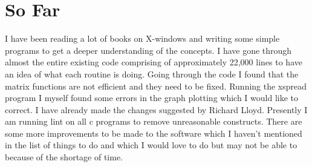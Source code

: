 \section{So Far}
I have been reading a lot of books on X-windows and writing some simple 
programs to get a deeper understanding of the concepts. I have gone through 
almost the entire existing code comprising of approximately 22,000 lines to 
have an idea of what each routine is doing. Going through the code I found 
that the matrix functions are not efficient and they need to be fixed. Running 
the xspread program I myself found some errors in the graph plotting which I 
would like to correct. I have already made the changes suggested by Richard 
Lloyd. Presently I am running lint on all c programs to remove unreasonable 
constructs. There are some more improvements to be made to the software which 
I haven't mentioned in the list of things to do and which I would love to do 
but may not be able to because of the shortage of time.



